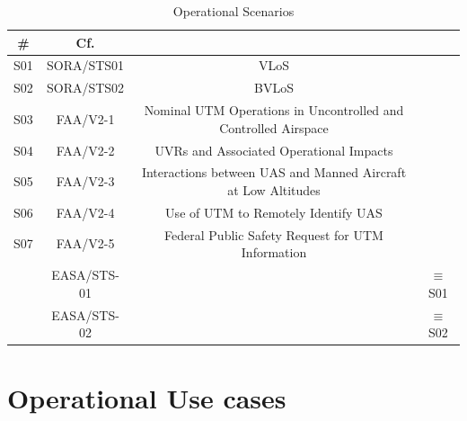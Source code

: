 \documentclass{ua_wgs_base}
\begin{document}
\begin{table}[tbh]
\begin{centering}
\begin{tabular}{|c|c|c|c|}
\hline 
\textbf{\#} & \textbf{Cf.} &  & \tabularnewline
\hline 
\hline 
S01 & SORA/STS01 & VLoS & \tabularnewline
\hline 
S02 & SORA/STS02 & BVLoS & \tabularnewline
\hline 
S03 & FAA/V2-1 & Nominal UTM Operations in Uncontrolled and Controlled Airspace & \tabularnewline
\hline 
S04 & FAA/V2-2 & UVRs and Associated Operational Impacts & \tabularnewline
\hline 
S05 & FAA/V2-3 & Interactions between UAS and Manned Aircraft at Low Altitudes & \tabularnewline
\hline 
S06 & FAA/V2-4 & Use of UTM to Remotely Identify UAS & \tabularnewline
\hline 
S07 & FAA/V2-5 & Federal Public Safety Request for UTM Information & \tabularnewline
\hline 
 & EASA/STS-01 &  & $\equiv$S01\tabularnewline
\hline 
 & EASA/STS-02 &  & $\equiv$S02\tabularnewline
\hline 
\end{tabular}
\par\end{centering}
\caption{Operational Scenarios}

\end{table}


\section{Operational Use cases}
\end{document}
